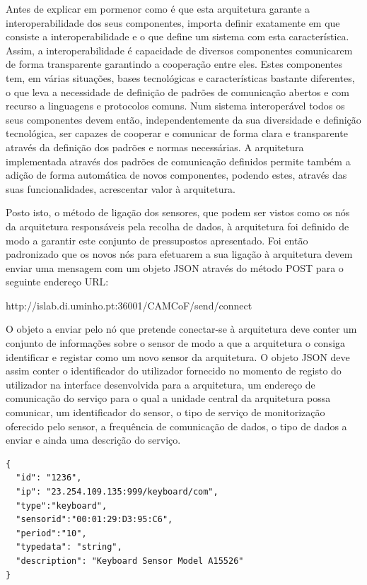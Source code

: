 Antes de explicar em pormenor como é que esta arquitetura garante a interoperabilidade dos seus componentes, importa definir exatamente em que consiste a interoperabilidade e o que define um sistema com esta característica. Assim, a interoperabilidade é capacidade de diversos componentes comunicarem de forma transparente garantindo a cooperação entre eles. Estes componentes tem, em várias situações, bases tecnológicas e características bastante diferentes, o que leva a necessidade de definição de padrões de comunicação abertos e com recurso a linguagens e protocolos comuns\cite{jammes2005service, song2009service}. Num sistema interoperável todos os seus componentes devem então, independentemente da sua diversidade e definição tecnológica, ser capazes de cooperar e comunicar de forma clara e transparente através da definição dos padrões e normas necessárias. A arquitetura implementada através dos padrões de comunicação definidos permite também a adição de forma automática de novos componentes, podendo estes, através das suas funcionalidades, acrescentar valor à arquitetura.

Posto isto, o método de ligação dos sensores, que podem ser vistos como os nós da arquitetura responsáveis pela recolha de dados, à arquitetura foi definido de modo a garantir este conjunto de pressupostos apresentado. Foi então padronizado que os novos nós para efetuarem a sua ligação à arquitetura devem enviar uma mensagem com um objeto JSON através do método POST para o seguinte endereço URL:

http://islab.di.uminho.pt:36001/CAMCoF/send/connect

O objeto a enviar pelo nó que pretende conectar-se à arquitetura deve conter um conjunto de informações sobre o sensor de modo a que a arquitetura o consiga identificar e registar como um novo sensor da arquitetura. O objeto JSON deve assim conter o identificador do utilizador fornecido no momento de registo do utilizador na interface desenvolvida para a arquitetura, um endereço de comunicação do serviço para o qual a unidade central da arquitetura possa comunicar, um identificador do sensor, o tipo de serviço de monitorização oferecido pelo sensor, a frequência de comunicação de dados, o tipo de dados a enviar e ainda uma descrição do serviço.

\begin{lstlisting}[caption=Exemplo de objeto JSON enviado por Sensor de Teclado]
{
  "id": "1236",
  "ip": "23.254.109.135:999/keyboard/com",
  "type":"keyboard",
  "sensorid":"00:01:29:D3:95:C6",
  "period":"10",
  "typedata": "string",
  "description": "Keyboard Sensor Model A15526"
}
\end{lstlisting}

